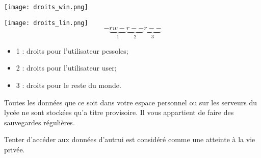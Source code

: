 \begin{minipage}[c]{.45\linewidth}
\begin{center}
\texttt{[image: droits\_win.png]}
\end{center}
\end{minipage}\hfill
\begin{minipage}[c]{.45\linewidth}
\begin{center}
\texttt{[image: droits\_lin.png]}
$$
-\underbrace{rw-}_{1}\underbrace{r--}_{2}\underbrace{r--}_{3}
$$
\begin{itemize}
\item 1 : droits pour l'utilisateur pessoles;
\item 2 : droits pour l'utilisateur user;
\item 3 : droits pour le reste du monde.
\end{itemize}
\end{center}
\end{minipage}


\begin{warn}
Toutes les données que ce soit dans votre espace personnel ou sur les serveurs du lycée ne sont stockées qu'a titre provisoire. Il vous appartient de faire des sauvegardes régulières.
\end{warn}


\begin{warn}
Tenter d'accéder aux données d'autrui est considéré comme une atteinte à la vie privée.
\end{warn}



